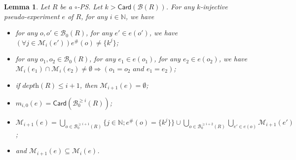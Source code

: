 \documentclass{article}
\theoremstyle{plain}
\newtheorem{lem}[theorem]{Lemma}
\newcommand{\Nat}{\ensuremath{\mathbb{N}}}
\newcommand{\Card}[1]{\textsf{Card}\left( #1 \right)}
\newcommand{\boxes}[1]{\mathcal{B}(#1)}
\newcommand{\boxesatzero}[1]{\mathcal{B}_{0}(#1)}
\newcommand{\boxesatzerogeq}[2]{\mathcal{B}_0^{\geq #2}(#1)}
\begin{document}
\begin{lem}\label{lemma: M_j(e)}
Let $R$ be a $\circ$-PS. 
Let $k > \Card{\boxes{R}{}}$. 
For any $k$-injective pseudo-experiment $e$ of $R$, for any $i \in \Nat$, we have 
\begin{itemize}
\item for any $o, o' \in \boxesatzero{R}$, for any $e' \in e(o')$, we have $(\forall j \in \mathcal{M}_i(e')) e^\#(o) \not= \{ k^j \}$;
\item for any $o_1, o_2 \in \boxesatzero{R}$, for any $e_1 \in e(o_1)$, for any $e_2 \in e(o_2)$, we have $\mathcal{M}_i(e_1) \cap \mathcal{M}_i(e_2) \not= \emptyset \Rightarrow (o_1 = o_2 \textit{ and } e_1 = e_2)$;
\item if $\textit{depth}(R) \leq i+1$, then $\mathcal{M}_{i+1}(e) = \emptyset$;
\item $m_{i, 0}(e) = \Card{\boxesatzerogeq{R}{i}}$;
\item $\mathcal{M}_{i+1}(e) = \bigcup_{o \in \boxesatzerogeq{R}{i+1}} \{ j \in \Nat ; e^\#(o) = \{ k^j \} \} \cup \bigcup_{o \in \boxesatzerogeq{R}{i+2}} \bigcup_{e' \in e(o)} \mathcal{M}_{i+1}(e')$;
\item and $\mathcal{M}_{i+1}(e) \subseteq \mathcal{M}_{i}(e)$.
\end{itemize}
\end{lem}
\end{document}
